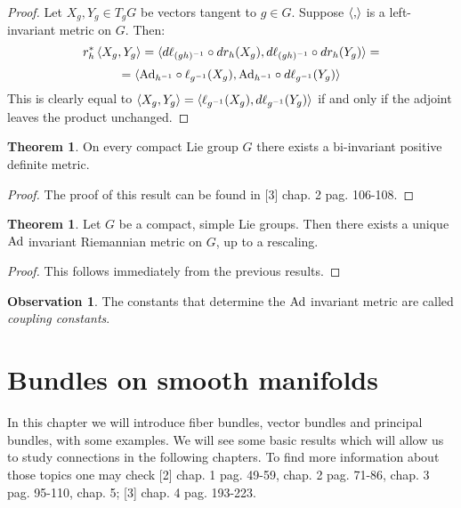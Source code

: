 \documentclass[12pt,a4paper]{report}
\theoremstyle{definition}
\theoremstyle{Theorem}
\newtheorem{Theo}[Def]{Theorem}
\theoremstyle{definition}
\theoremstyle{definition}
\newtheorem{Obs}[Def]{Observation}
\begin{document}
	\begin{proof}
		Let $X_g,Y_g\in T_gG$ be vectors tangent to $g\in G$. Suppose $\braket{,}$ is a left-invariant metric on $G$. Then:
		$$r_h^*\braket{X_g,Y_g}=\braket{d\ell_{(gh)^{-1}}\circ dr_h(X_g),d\ell_{(gh)^{-1}}\circ dr_h(Y_g)}=$$
		$$=\braket{\hbox{Ad}_{h^{-1}}\circ \ell_{g^{-1}}(X_g),\hbox{Ad}_{h^{-1}}\circ d\ell_{g^{-1}}(Y_g)}$$
		This is clearly equal to $\braket{X_g,Y_g}=\braket{\ell_{g^{-1}}(X_g),d\ell_{g^{-1}}(Y_g)}$ if and only if the adjoint leaves the product unchanged.
	\end{proof}
	\begin{Theo} \label{Scal_prod_theo_1}
		On every compact Lie group $G$ there exists a bi-invariant positive definite metric.
	\end{Theo}
	\begin{proof}
		The proof of this result can be found in [3] chap. 2 pag. 106-108.
	\end{proof}
	\begin{Theo}
		Let $G$ be a compact, simple Lie groups. Then there exists a unique $\hbox{Ad}$ invariant Riemannian metric on $G$, up to a rescaling.
	\end{Theo}
	\begin{proof}
		This follows immediately from the previous results.
	\end{proof}
	\begin{Obs}
		The constants that determine the $\hbox{Ad}$ invariant metric are called \textit{coupling constants}.
	\end{Obs}
	\chapter{Bundles on smooth manifolds}
	In this chapter we will introduce fiber bundles, vector bundles and principal bundles, with some examples. We will see some basic results which will allow us to study connections in the following chapters. To find more information about those topics one may check [2] chap. 1 pag. 49-59, chap. 2 pag. 71-86, chap. 3 pag. 95-110, chap. 5; [3] chap. 4 pag. 193-223.
\end{document}
